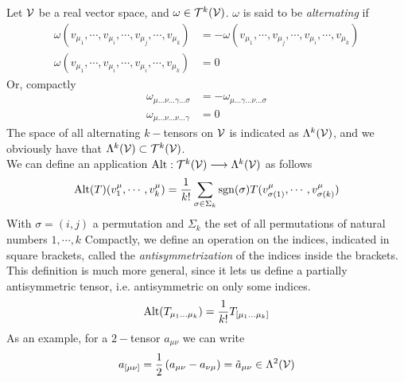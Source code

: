 \documentclass[../complete.tex]{subfiles}
\begin{document}
\begin{dfn}
	Let $\mathcal{V}$ be a real vector space, and $\omega\in\mathcal{T}^k(\mathcal{V})$. $\omega$ is said to be \textit{alternating} if
	\begin{equation}
		\begin{aligned}
			\omega(v_{\mu_1},\cdots,v_{\mu_i},\cdots,v_{\mu_j},\cdots,v_{\mu_k})&=-\omega(v_{\mu_1},\cdots,v_{\mu_j},\cdots,v_{\mu_i},\cdots,v_{\mu_k})\\
			\omega(v_{\mu_1},\cdots,v_{\mu_i},\cdots,v_{\mu_i},\cdots,v_{\mu_k})&=0
		\end{aligned}
		\label{eq:alternatingtensor}
	\end{equation}
	Or, compactly
	\begin{equation}
		\begin{aligned}
			\omega_{\mu\ldots\nu\ldots\gamma\ldots\sigma}&=-\omega_{\mu\ldots\gamma\ldots\nu\ldots\sigma}\\
			\omega_{\mu\ldots\nu\ldots\nu\ldots\gamma}&=0
		\end{aligned}
		\label{eq:alttensein}
	\end{equation}
	The space of all alternating $k-$tensors on $\mathcal{V}$ is indicated as $\Lambda^k(\mathcal{V})$, and we obviously have that $\Lambda^k(\mathcal{V})\subset\mathcal{T}^k(\mathcal{V})$.\\
	We can define an application $\operatorname{Alt}:\mathcal{T}^k(\mathcal{V})\overset{}{\longrightarrow}\Lambda^k(\mathcal{V})$ as follows
	\begin{equation}
		\operatorname{Alt}(T)(v^\mu_1,\cdots,v^\mu_k)=\frac{1}{k!}\sum_{\sigma\in\Sigma_k}\operatorname{sgn}(\sigma)T(v^\mu_{\sigma(1)},\cdots,v^\mu_{\sigma(k)})
		\label{eq:alternating}
	\end{equation}
	With $\sigma=(i,j)$ a permutation and $\Sigma_k$ the set of all permutations of natural numbers $1,\cdots,k$
	Compactly, we define an operation on the indices, indicated in square brackets, called the \textit{antisymmetrization} of the indices inside the brackets.\\
	This definition is much more general, since it lets us define a partially antisymmetric tensor, i.e. antisymmetric on only some indices.
	\begin{equation}
		\operatorname{Alt}(T_{\mu_1\ldots\mu_k})=\frac{1}{k!}T_{[\mu_1\ldots\mu_k]}
		\label{eq:antisymmbra}
	\end{equation}
	As an example, for a $2-$tensor $a_{\mu\nu}$ we can write
	\begin{equation}
		a_{[\mu\nu]}=\frac{1}{2}\left( a_{\mu\nu}-a_{\nu\mu} \right)=\tilde{a}_{\mu\nu}\in\Lambda^2(\mathcal{V})
		\label{eq:2tensorantisymmbra}
	\end{equation}

\end{dfn}
\end{document}
